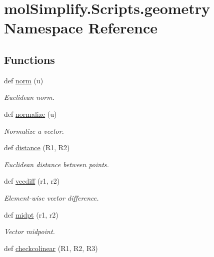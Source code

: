 \hypertarget{namespacemolSimplify_1_1Scripts_1_1geometry}{}\section{mol\+Simplify.\+Scripts.\+geometry Namespace Reference}
\label{namespacemolSimplify_1_1Scripts_1_1geometry}
\subsection*{Functions}
\begin{DoxyCompactItemize}
\item 
def \hyperlink{namespacemolSimplify_1_1Scripts_1_1geometry_ab22dfc9103deb322f3fe52878f24aec9}{norm} (u)
\begin{DoxyCompactList}\small\item\em Euclidean norm. \end{DoxyCompactList}\item 
def \hyperlink{namespacemolSimplify_1_1Scripts_1_1geometry_a6b3a18a3eb0c01b23c6acb6f374e1850}{normalize} (u)
\begin{DoxyCompactList}\small\item\em Normalize a vector. \end{DoxyCompactList}\item 
def \hyperlink{namespacemolSimplify_1_1Scripts_1_1geometry_a862dd678e349d0608d2568670e1b7200}{distance} (R1, R2)
\begin{DoxyCompactList}\small\item\em Euclidean distance between points. \end{DoxyCompactList}\item 
def \hyperlink{namespacemolSimplify_1_1Scripts_1_1geometry_af1b60f550f00adbeeb61fcff1482d793}{vecdiff} (r1, r2)
\begin{DoxyCompactList}\small\item\em Element-\/wise vector difference. \end{DoxyCompactList}\item 
def \hyperlink{namespacemolSimplify_1_1Scripts_1_1geometry_a05a77dc1d71d199b47473f48f992b101}{midpt} (r1, r2)
\begin{DoxyCompactList}\small\item\em Vector midpoint. \end{DoxyCompactList}\item 
def \hyperlink{namespacemolSimplify_1_1Scripts_1_1geometry_a0280692d9c985bc7dccab778bb908aa7}{checkcolinear} (R1, R2, R3)

\end{DoxyCompactItemize}
